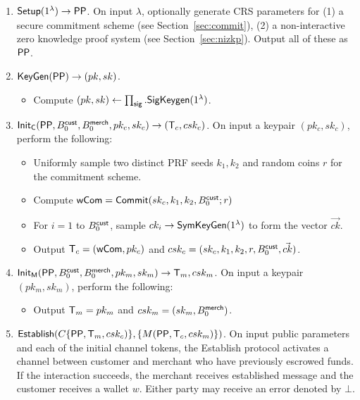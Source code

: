 \documentclass[11pt]{report}
\newcommand{\BC}{B^{\text{\sf cust}}_{\text{0}}}
\newcommand{\BM}{B^{\text{\sf merch}}_{\text{0}}}
\begin{document}
\begin{enumerate}

\item ${\sf Setup}(1^\lambda) \rightarrow {\sf PP}$. On input $\lambda$, optionally generate CRS parameters for (1) a secure commitment scheme (see Section~\ref{sec:commit}), (2) a non-interactive zero knowledge proof system (see Section~\ref{sec:nizkp}). Output all of these as ${\sf PP}$.

\item ${\sf KeyGen}({\sf PP}) \rightarrow (pk, sk)$. 
\begin{itemize}
\item Compute $(pk, sk) \leftarrow \prod_{\sf sig}.{\sf SigKeygen}(1^\lambda)$. %
\end{itemize}

\medskip \noindent
\item ${\sf Init_{C}}({\sf PP}, \BC, \BM, pk_c, sk_c) \rightarrow ({\sf T}_c, csk_c)$. On input a keypair $(pk_c, sk_c)$, perform the following:

\begin{itemize} 
\item Uniformly sample two distinct PRF seeds $k_1, k_2$ and random coins $r$ for the commitment scheme. 
\item Compute ${\sf wCom} = {\sf Commit}(sk_c, k_1, k_2, \BC; r)$
\item For $i = 1$ to $\BC$, sample $ck_i \rightarrow {\sf SymKeyGen}(1^\lambda)$ to form the vector $\vec{ck}$. 
\item Output ${\sf T}_c = ({\sf wCom}, pk_c)$ and $csk_c = (sk_c, k_1, k_2, r, \BC, \vec{ck})$.
\end{itemize}

\item ${\sf Init_{M}}({\sf PP}, \BC, \BM, pk_m, sk_m) \rightarrow {\sf T}_m, csk_m$. On input a keypair $(pk_m, sk_m)$, perform the following:

\begin{itemize} 
\item Output ${\sf T}_m = pk_m$ and $csk_m = (sk_m, \BM)$.
\end{itemize}

\item ${\sf Establish}( C\{{\sf PP}, {\sf T}_m, csk_c)\}, \{M({\sf PP}, {\sf T}_c, csk_{m})\})$. On input public parameters and each of the initial
channel tokens, the {\sf Establish} protocol activates a channel between customer and merchant who have previously
escrowed funds. If the interaction succeeds, the merchant receives {\sf established} message and the customer
receives a wallet $w$. Either party may receive an error denoted by $\bot$.


\end{enumerate}
\end{document}
